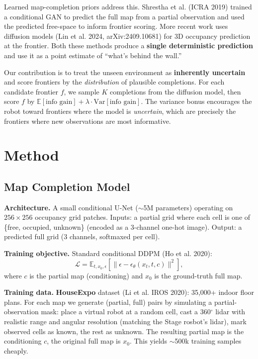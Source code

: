 \documentclass[11pt]{article}
\begin{document}
Learned map-completion priors address this. Shrestha et al. (ICRA 2019) trained a conditional GAN to predict the full map from a partial observation and used the predicted free-space to inform frontier scoring. More recent work uses diffusion models (Lin et al. 2024, arXiv:2409.10681) for 3D occupancy prediction at the frontier. Both these methods produce a \textbf{single deterministic prediction} and use it as a point estimate of ``what's behind the wall.''

Our contribution is to treat the unseen environment as \textbf{inherently uncertain} and score frontiers by the \emph{distribution} of plausible completions. For each candidate frontier $f$, we sample $K$ completions from the diffusion model, then score $f$ by $\mathbb{E}[\text{info gain}] + \lambda \cdot \text{Var}[\text{info gain}]$. The variance bonus encourages the robot toward frontiers where the model is \emph{uncertain}, which are precisely the frontiers where new observations are most informative.

\section{Method}

\subsection{Map Completion Model}

\textbf{Architecture.} A small conditional U-Net ($\sim$5M parameters) operating on $256\times256$ occupancy grid patches. Inputs: a partial grid where each cell is one of \{free, occupied, unknown\} (encoded as a 3-channel one-hot image). Output: a predicted full grid (3 channels, softmaxed per cell).

\textbf{Training objective.} Standard conditional DDPM (Ho et al. 2020):
\[
\mathcal{L} = \mathbb{E}_{t, x_0, \epsilon}\left[\| \epsilon - \epsilon_\theta(x_t, t, c) \|^2\right],
\]
where $c$ is the partial map (conditioning) and $x_0$ is the ground-truth full map.

\textbf{Training data.} \textbf{HouseExpo} dataset (Li et al. IROS 2020): 35,000+ indoor floor plans. For each map we generate (partial, full) pairs by simulating a partial-observation mask: place a virtual robot at a random cell, cast a 360$^\circ$ lidar with realistic range and angular resolution (matching the Stage rosbot's lidar), mark observed cells as known, the rest as unknown. The resulting partial map is the conditioning $c$, the original full map is $x_0$. This yields $\sim$500k training samples cheaply.
\end{document}

